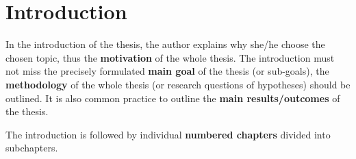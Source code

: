 \chapter*{Introduction}

In the introduction of the thesis, the author explains why she/he choose the 
chosen topic, thus the \textbf{motivation} of the whole thesis. The introduction must not 
miss the precisely formulated \textbf{main goal} of the thesis (or sub-goals), the 
\textbf{methodology} of the whole thesis (or research questions of hypotheses) should be 
outlined. It is also common practice to outline the \textbf{main results/outcomes} of the 
thesis.

The introduction is followed by individual \textbf{numbered chapters} divided into 
subchapters.
